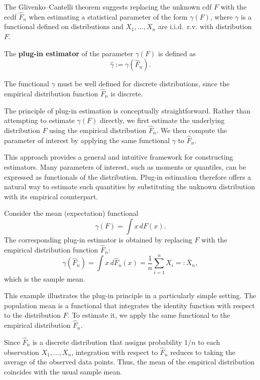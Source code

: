 The Glivenko--Cantelli theorem suggests replacing the unknown 
cdf \(F\) with the ecdf \(\hat F_n\) when
estimating a statistical parameter of the form \(\gamma(F)\), where
\(\gamma\) is a functional defined on distributions and
\(X_1, \dots, X_n\) are i.i.d.\ r.v. with distribution \(F\).

\begin{definition}
The \textbf{plug-in estimator} of the parameter \(\gamma(F)\) is defined as
\[
\hat{\gamma} := \gamma(\hat F_n).
\]
\end{definition}

\begin{note}
The functional \(\gamma\) must be well defined for discrete distributions,
since the empirical distribution function \(\hat F_n\) is discrete.
\end{note}

The principle of plug-in estimation is conceptually straightforward.
Rather than attempting to estimate \(\gamma(F)\) directly, we first estimate
the underlying distribution \(F\) using the empirical distribution
\(\hat F_n\). We then compute the parameter of interest by applying the same
functional \(\gamma\) to \(\hat F_n\).

This approach provides a general and intuitive framework for constructing
estimators. Many parameters of interest, such as moments or quantiles, can be
expressed as functionals of the distribution. Plug-in estimation therefore
offers a natural way to estimate such quantities by substituting the unknown
distribution with its empirical counterpart.

\begin{ex}
Consider the mean (expectation) functional
\[
\gamma(F) = \int x \, dF(x).
\]
The corresponding plug-in estimator is obtained by replacing \(F\) with the
empirical distribution function \(\hat F_n\):
\[
\gamma(\hat F_n)
= \int x \, d\hat F_n(x)
= \frac{1}{n} \sum_{i=1}^n X_i
=: \bar X_n,
\]
which is the sample mean.
\end{ex}

This example illustrates the plug-in principle in a particularly simple
setting. The population mean is a functional that integrates the identity
function with respect to the distribution \(F\). To estimate it, we apply the
same functional to the empirical distribution \(\hat F_n\).

Since \(\hat F_n\) is a discrete distribution that assigns probability
\(1/n\) to each observation \(X_1, \dots, X_n\), integration with respect to
\(\hat F_n\) reduces to taking the average of the observed data points. Thus,
the mean of the empirical distribution coincides with the usual sample mean.

